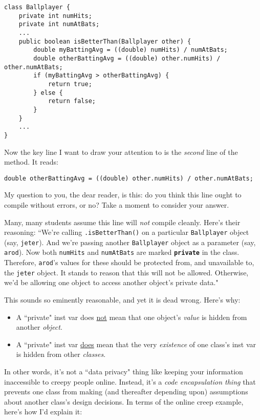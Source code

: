 \begin{Verbatim}[fontsize=\footnotesize,samepage=true,frame=single]
class Ballplayer {
    private int numHits;
    private int numAtBats;
    ...
    public boolean isBetterThan(Ballplayer other) {
        double myBattingAvg = ((double) numHits) / numAtBats;
        double otherBattingAvg = ((double) other.numHits) / other.numAtBats;
        if (myBattingAvg > otherBattingAvg) {
            return true;
        } else {
            return false;
        }
    }
    ...
}
\end{Verbatim}

Now the key line I want to draw your attention to is the \textit{second} line
of the method. It reads:

\begin{verbatim}
double otherBattingAvg = ((double) other.numHits) / other.numAtBats;
\end{verbatim}

My question to you, the dear reader, is this: do you think this line ought to
compile without errors, or no? Take a moment to consider your answer.

Many, many students assume this line will \textit{not} compile cleanly. Here's
their reasoning: ``We're calling \texttt{.isBetterThan()} on a particular
\texttt{Ballplayer} object (say, \texttt{jeter}). And we're passing another
\texttt{Ballplayer} object as a parameter (say, \texttt{arod}). Now both
\texttt{numHits} and \texttt{numAtBats} are marked \textbf{\texttt{private}}
in the class. Therefore, \texttt{arod}'s values for these should be protected
from, and unavailable to, the \texttt{jeter} object. It stands to reason that
this will not be allowed. Otherwise, we'd be allowing one object to access
another object's private data."

This sounds so eminently reasonable, and yet it is dead wrong. Here's why:

\begin{itemize}
\itemsep.1em
\item A ``private" inst var does \underline{not} mean that one object's
\textit{value} is hidden from another \textit{object}.
\item A ``private" inst var \underline{does} mean that the very
\textit{existence} of one class's inst var is hidden from other
\textit{classes}.
\end{itemize}

In other words, it's not a ``data privacy" thing like keeping your information
inaccessible to creepy people online. Instead, it's a \textit{code
encapsulation thing} that prevents one class from making (and thereafter
depending upon) assumptions about another class's design decisions. In terms
of the online creep example, here's how I'd explain it:

